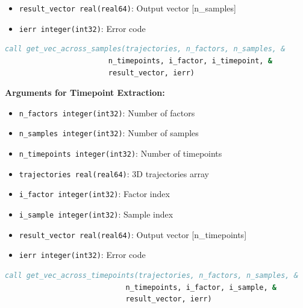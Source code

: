 \begin{enumerate}
\begin{enumerate}
\begin{itemize}
                    \item \texttt{result\_vector real(real64)}: Output vector [n\_samples]
                          
                    \item \texttt{ierr integer(int32)}: Error code
                  \end{itemize}
                  \begin{lstlisting}[language=Fortran, caption={Extract Samples Vector}]
call get_vec_across_samples(trajectories, n_factors, n_samples, &
                        n_timepoints, i_factor, i_timepoint, &
                        result_vector, ierr)
                  \end{lstlisting}
                  
                  \textbf{Arguments for Timepoint Extraction:}
                  \begin{itemize}
                    \item \texttt{n\_factors integer(int32)}: Number of factors
                          
                    \item \texttt{n\_samples integer(int32)}: Number of samples
                          
                    \item \texttt{n\_timepoints integer(int32)}: Number of timepoints
                          
                    \item \texttt{trajectories real(real64)}: 3D trajectories array
                          
                    \item \texttt{i\_factor integer(int32)}: Factor index
                          
                    \item \texttt{i\_sample integer(int32)}: Sample index
                          
                    \item \texttt{result\_vector real(real64)}: Output vector [n\_timepoints]
                          
                    \item \texttt{ierr integer(int32)}: Error code
                  \end{itemize}
                  \begin{lstlisting}[language=Fortran, caption={Extract Timepoints Vector}]
call get_vec_across_timepoints(trajectories, n_factors, n_samples, &
                            n_timepoints, i_factor, i_sample, &
                            result_vector, ierr)
                  \end{lstlisting}
                  

\end{enumerate}
\end{enumerate}
